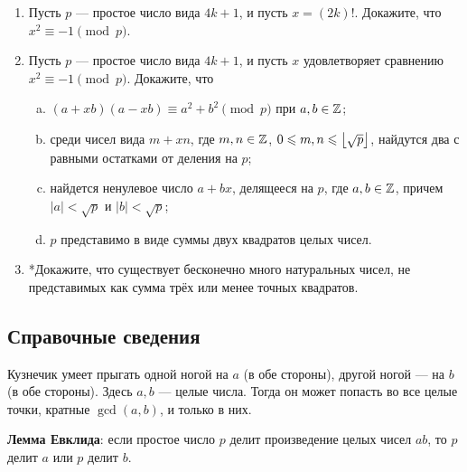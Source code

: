 \begin{enumerate}
\item Пусть $p$ --- простое число вида $4k+1$, и пусть $x=(2k)!$. Докажите, что $x^2\equiv -1\pmod p$.
\item Пусть $p$ --- простое число вида $4k+1$, и пусть $x$ удовлетворяет сравнению $x^2\equiv -1\pmod p$. Докажите, что
\begin{enumerate}[a)]
\item $(a+xb)(a-xb) \equiv a^2+b^2 \pmod p$ при $a,b\in\mathbb Z$;
\item среди чисел вида $m+xn$, где $m,n\in\mathbb Z$, $0\leqslant m,n\leqslant\left\lfloor\sqrt p\right\rfloor$, найдутся два с равными остатками от деления на $p$;
\item найдется ненулевое число $a+bx$, делящееся на $p$, где $a,b\in\mathbb Z$, причем $|a|<\sqrt p$ и $|b|<\sqrt p$;
\item $p$ представимо в виде суммы двух квадратов целых чисел.
\end{enumerate}

\item *Докажите, что существует бесконечно много натуральных чисел, не представимых как сумма трёх или менее точных квадратов.

\end{enumerate}

\subsection*{Справочные сведения}

Кузнечик умеет прыгать одной ногой на $a$ (в обе стороны), другой ногой --- на $b$ (в обе стороны). Здесь $a,b$ --- целые числа. Тогда он может попасть во все целые точки, кратные $\gcd(a,b)$, и только в них.

\textbf{Лемма Евклида}: если простое число $p$ делит произведение целых чисел $ab$, то $p$ делит $a$ или $p$ делит $b$.

